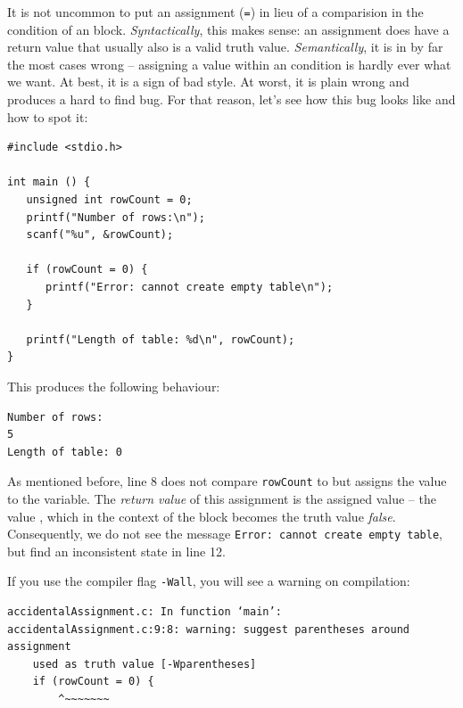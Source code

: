 \begin{warnbox}[Common mistake: Comparison operator \texttt{==} vs. assignment operator \texttt{=}]
It is not uncommon to put an assignment (\texttt{=}) in lieu of a comparision in the condition of an  block. \emph{Syntactically}, this makes sense: an assignment does have a return value that usually also is a valid truth value. \emph{Semantically}, it is in by far the most cases wrong -- assigning a value within an  condition is hardly ever what we want. At best, it is a sign of bad style. At worst, it is plain wrong and produces a hard to find bug. For that reason, let's see how this bug looks like and how to spot it:

\begin{warnbox}[accidentalAssignment.c, leftupper=7mm]
\begin{verbatim}
#include <stdio.h>

int main () {
   unsigned int rowCount = 0;
   printf("Number of rows:\n");
   scanf("%u", &rowCount);

   if (rowCount = 0) {
      printf("Error: cannot create empty table\n");
   }

   printf("Length of table: %d\n", rowCount);
}
\end{verbatim}
\end{warnbox}

This produces the following behaviour:

\begin{cmdbox}
\begin{verbatim}
Number of rows:
5
Length of table: 0
\end{verbatim}
\end{cmdbox}

As mentioned before, line 8 does not compare \texttt{rowCount} to  but assigns the value to the variable. The \emph{return value} of this assignment is the assigned value -- \ie the value , which in the context of the  block becomes the truth value \emph{false}. Consequently, we do not see the message \texttt{Error: cannot create empty table}, but find an inconsistent state in line 12.

If you use the compiler flag \texttt{-Wall}, you will see a warning on compilation:

\begin{cmdbox}
\begin{verbatim}
accidentalAssignment.c: In function ‘main’:
accidentalAssignment.c:9:8: warning: suggest parentheses around assignment 
    used as truth value [-Wparentheses]
    if (rowCount = 0) {
        ^~~~~~~~
\end{verbatim}
\end{cmdbox}
\end{warnbox}

